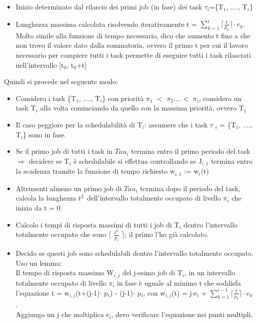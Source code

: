 \documentclass[12pt, oneside]{extbook}
\begin{document}
\begin{itemize}
\item Inizio determinato dal rilascio dei primi job (in fase) dei task $\tau_{i}$=\{T$_{1}$, ...., T$_{i}$\}
\item Lunghezza massima calcolata risolvendo iterativamente t = $\sum\limits_{k=1}^{i}\lceil\frac{t}{p_{k}}\rceil \cdot e_{k}$. Molto simile alla funzione di tempo necessario, dico che aumento t fino a che non trovo il valore dato dalla sommatoria, ovvero il primo t per cui il lavoro necessario per compiere tutti i task permette di eseguire tutti i task rilasciati nell'intervallo [t$_{0}$, t$_{0}$+t] 
\end{itemize}
Quindi si procede nel seguente modo:
\begin{itemize}
\item Considero i task \{T$_{1}$, ...., T$_{i}$\} con priorità $\pi_{1}$ $<$ $\pi_{2}$....$<$ $\pi_{i}$, considero un task T$_{i}$ alla volta cominciando da quello con la massima priorità, ovvero T$_{1}$
\item Il caso peggiore per la schedulabilità di T$_{i}$: assumere che i task $\tau$ $_{i}$ = \{T$_{1}$, ...., T$_{i}$\} sono in fase.
\item Se il primo job di tutti i task in $Tau_{i}$ termina entro il primo periodo del task $\Rightarrow$ decidere se T$_{i}$ è  schedulabile si effettua controllando se J$_{i,1}$ termina entro la scadenza tramite la funzione di tempo richiesto w$_{i,1}$ := w$_{i}$(t)
\item Altrimenti almeno un primo job di $Tau_{i}$ termina dopo il periodo del task, calcola la lunghezza $t^L$ dell'intervallo totalmente occupato di livello $\pi_{i}$ che inizia da t = 0.
\item Calcolo i tempi di risposta massimi di tutti i job di T$_{i}$ dentro l'intervallo totalmente occupato che sono $\lceil$ $\frac{t^L}{p_{i}}$ $\rceil$; il primo l'ho già calcolato.
\item Decido se questi job sono schedulabili dentro l'intervallo totalmente occupato. Uso un lemma:\\
Il tempo di risposta massimo W$_{i,j}$ del j-esimo job di T$_{i}$, in un intervallo totalmente occupato di livello $\pi_{i}$ in fase è uguale al minimo t che soddisfa l'equazione t = w$_{i,j}$(t+(j-1)$\cdot$ p$_{i}$) - (j-1)$\cdot$ p$_{i}$, con w$_{i,j}$(t) = j$\cdot$e$_{i}$ + $\sum\limits_{k=1}^{i-1}\lceil\frac{t}{p_{k}}\rceil \cdot e_{k}$.\\ Aggiungo un j che moltiplica e$_{i}$, devo verificare l'equazione nei punti multipli.\\ 
\end{itemize}
\end{document}
